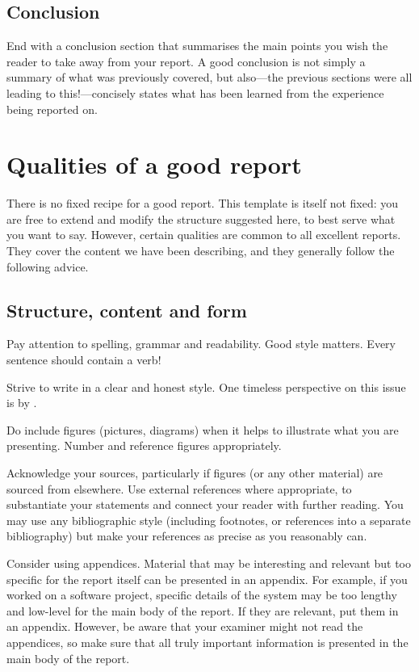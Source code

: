 \documentclass[british,12pt,a4paper]{report}
\begin{document}
\section{Conclusion}

End with a conclusion section that summarises the main points
you wish the reader to take away from your report.
A good conclusion is not simply a summary of what was previously
covered, but also---the previous sections
were all leading to this!---concisely states what has been learned
from the experience being reported on.

\chapter{Qualities of a good report}

There is no fixed recipe for a good report.
This template is itself not fixed:
you are free to extend and modify the structure suggested here,
to best serve what you want to say.
However, certain qualities are common to all excellent reports.
They cover the content we have been describing,
and they generally follow the following advice.

\section{Structure, content and form}

Pay attention to spelling, grammar and readability.
Good style matters. Every sentence should contain a verb!

Strive to write in a clear and honest style.
One timeless perspective on this issue is by \citet{orwell_politics_1946}.

Do include figures (pictures, diagrams) when it helps to illustrate what you are presenting.
Number and reference figures appropriately.

Acknowledge your sources, particularly if figures (or any other material)
are sourced from elsewhere.
Use external references where appropriate,
to substantiate your statements and connect your reader with further reading.
You may use any bibliographic style (including footnotes, or references
into a separate bibliography) but make your references as precise as you reasonably can.

Consider using appendices.
Material that may be interesting and relevant but too specific for the report itself
can be presented in an appendix.
For example, if you worked on a software project,
specific details of the system may be too lengthy and low-level for the main body of the report.
If they are relevant, put them in an appendix.
However, be aware that your examiner might not read the appendices,
so make sure that all truly important information
is presented in the main body of the report.
\end{document}
